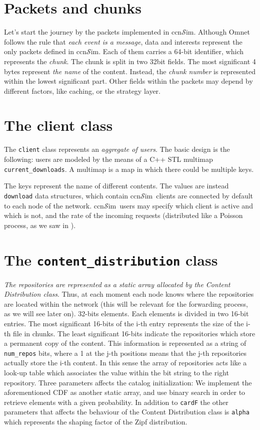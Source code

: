 \documentclass{book}
\newcommand{\ccnsim}{ccn$\mathcal{S}$im}
\begin{document}
\section{Packets and chunks}
Let's start the journey by the packets implemented in \ccnsim. Although Omnet follows the rule that \emph{each event is a message}, data and interests represent the only packets defined in \ccnsim. Each of them carries a 64-bit identifier, which represents the  \emph{chunk}. The chunk is split in two 32bit fields. The most significant 4 bytes represent \emph{the name} of the content. Instead, the \emph{chunk number} is represented  within the lowest significant part. Other fields within the packets may depend by different factors, like caching, or the strategy layer.
\section{The client class}
The \verb|client| class represents an \emph{aggregate of users}. The basic design is the following: users are modeled by the means of a C++ STL multimap \verb|current_downloads|. A multimap is a map in which there could be multiple keys. 

The keys represent the name of different contents. The values are instead \verb|download| data structures, which contain   \ccnsim\ clients are connected by default to each node of the network. \ccnsim\ users may specify which client is active and which is not, and the rate of the incoming requests (distributed like a Poisson process, as we saw in ).  
\section{The \texttt{content\_distribution} class}
	\emph{The repositories are represented as a static array allocated by the Content Distribution class}. Thus, at each moment each node knows where the repositories are located within the network (this will be relevant for the forwarding process, as we will see later on).
32-bits elements. Each elements is divided in two 16-bit entries. The most significant 16-bits of the i-th entry represents the size of the i-th file in chunks. The least significant 16-bits indicate the repositories which store a permanent copy of the content. This information is represented as  a string of \verb|num_repos| bits, where a 1 at the j-th positions means that the j-th repositories actually store the i-th content. In this sense the array of repositories acts like a look-up table which associates the value within the bit string to the right repository. Three parameters affects the catalog initialization:
We implement the aforementioned CDF as another static array, and use binary search in order to retrieve elements with a given probability. In addition to \verb|cardF| the other parameters that affects the behaviour of the Content Distribution class is \verb|alpha| which represents the shaping factor of the Zipf distribution. 
\end{document}
